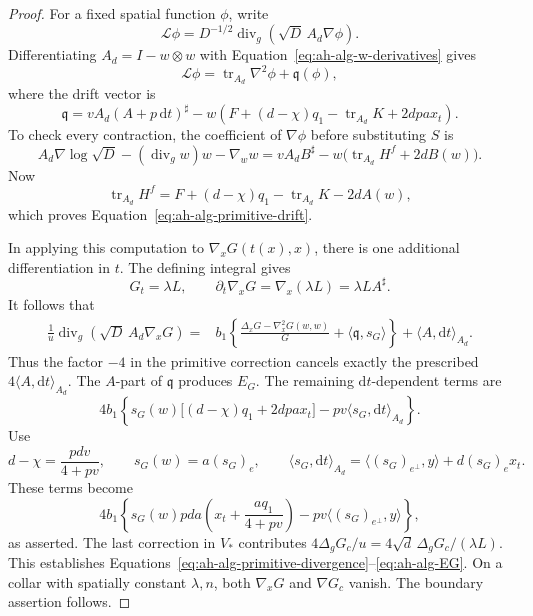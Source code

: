 \begin{proof}
For a fixed spatial function \(\phi\), write
\[
 \mathcal L\phi
 =D^{-1/2}\operatorname{div}_g(\sqrt D\,A_d\nabla\phi).
\]
Differentiating \(A_d=I-w\otimes w\) with
Equation~\eqref{eq:ah-alg-w-derivatives} gives
\[
 \mathcal L\phi
    =\operatorname{tr}_{A_d}\nabla^2\phi
        +\mathfrak q(\phi),
\]
where the drift vector is
\begin{equation}
 \mathfrak q
 =vA_d(A+p\,\mathrm dt)^\sharp
  -w\left(F+(d-\chi)q_1-\operatorname{tr}_{A_d}K
                         +2dpa x_t\right).
 \label{eq:ah-alg-primitive-drift}
\end{equation}
To check every contraction, the coefficient of \(\nabla\phi\) before
substituting \(S\) is
\[
 A_d\nabla\log\sqrt D
       -(\operatorname{div}_gw)w-\nabla_ww
 =vA_dB^\sharp
       -w\bigl(\operatorname{tr}_{A_d}H^f+2dB(w)\bigr).
\]
Now
\[
 \operatorname{tr}_{A_d}H^f
  =F+(d-\chi)q_1-\operatorname{tr}_{A_d}K-2dA(w),
\]
which proves Equation~\eqref{eq:ah-alg-primitive-drift}.

In applying this computation to \(\nabla_xG(t(x),x)\), there is one
additional differentiation in \(t\).  The defining integral gives
\[
 G_t=\lambda L,\qquad
 \partial_t\nabla_xG=\nabla_x(\lambda L)=\lambda L A^\sharp.
\]
It follows that
\begin{align*}
 \frac1u\operatorname{div}_g(\sqrt D\,A_d\nabla_xG)
  ={}&b_1\left\{
        \frac{\Delta_xG-\nabla_x^2G(w,w)}G
                 +\langle\mathfrak q,s_G\rangle
        \right\}
      +\langle A,\mathrm dt\rangle_{A_d}.
\end{align*}
Thus the factor \(-4\) in the primitive correction cancels exactly
the prescribed \(4\langle A,\mathrm dt\rangle_{A_d}\).
The \(A\)-part of \(\mathfrak q\) produces \(E_G\).  The remaining
\(\mathrm dt\)-dependent terms are
\[
 4b_1\left\{
   s_G(w)\bigl[(d-\chi)q_1+2dpa x_t\bigr]
                  -pv\langle s_G,\mathrm dt\rangle_{A_d}
       \right\}.
\]
Use
\[
 d-\chi=\frac{pdv}{4+pv},\qquad
 s_G(w)=a(s_G)_e,\qquad
 \langle s_G,\mathrm dt\rangle_{A_d}
       =\langle(s_G)_{e^\perp},y\rangle+d(s_G)_e x_t.
\]
These terms become
\[
 4b_1\left\{s_G(w)pda
                \left(x_t+\frac{a q_1}{4+pv}\right)
                    -pv\langle(s_G)_{e^\perp},y\rangle\right\},
\]
as asserted.  The last correction in \(V_*\) contributes
\(4\Delta_gG_c/u=4\sqrt d\,\Delta_gG_c/(\lambda L)\).
This establishes
Equations~\eqref{eq:ah-alg-primitive-divergence}--\eqref{eq:ah-alg-EG}.
On a collar with spatially constant \(\lambda,n\), both
\(\nabla_xG\) and \(\nabla G_c\) vanish.  The boundary assertion
follows.
\end{proof}

